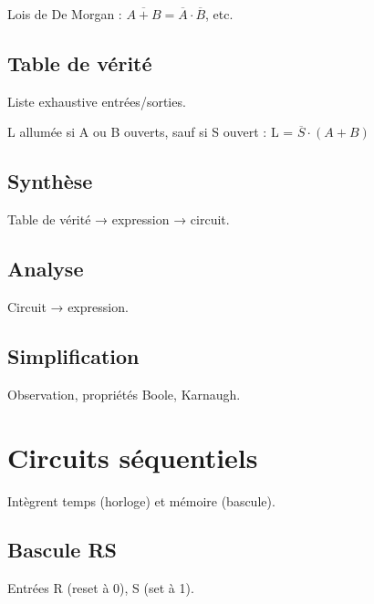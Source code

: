 \documentclass[12pt,a4paper]{article}
\begin{document}
\begin{remarque}
Lois de De Morgan : $\overline{A+B} = \overline{A} \cdot \overline{B}$, etc.
\end{remarque}

\subsection{Table de vérité}
\begin{methode}
Liste exhaustive entrées/sorties.
\end{methode}

\begin{exemple}
L allumée si A ou B ouverts, sauf si S ouvert : L = $\overline{S} \cdot (A + B)$
\end{exemple}

\subsection{Synthèse}
\begin{methode}
Table de vérité → expression → circuit.
\end{methode}

\subsection{Analyse}
\begin{methode}
Circuit → expression.
\end{methode}

\subsection{Simplification}
\begin{methode}
Observation, propriétés Boole, Karnaugh.
\end{methode}

\newpage
\section{Circuits séquentiels}

\begin{definition}
Intègrent temps (horloge) et mémoire (bascule).
\end{definition}

\subsection{Bascule RS}
\begin{definition}
Entrées R (reset à 0), S (set à 1).
\end{definition}
\end{document}

